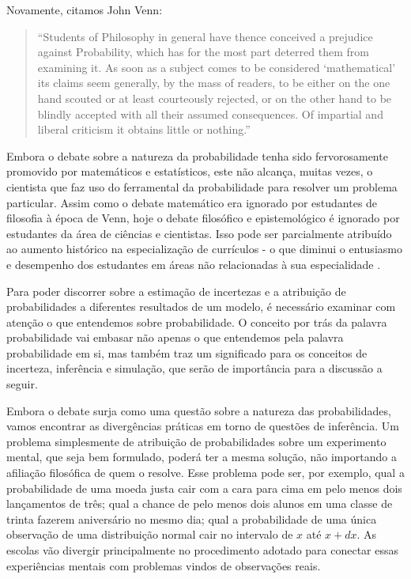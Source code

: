 Novamente, citamos John Venn:

\begin{quote}
``Students of Philosophy in general have thence conceived a prejudice against Probability, which has for the most part
deterred them from examining it. As soon as a subject comes to be considered `mathematical' its claims seem generally,
by the mass of readers, to be either on the one hand scouted or at least courteously rejected, or on the other hand
to be blindly accepted with all their assumed consequences. Of impartial and liberal criticism it obtains little or nothing.''
\citep{Venn1866}
\end{quote}

Embora o debate sobre a natureza da probabilidade tenha sido fervorosamente promovido por matemáticos e estatísticos,
este não alcança, muitas vezes, o cientista que faz uso do ferramental da probabilidade para resolver um problema particular.
Assim como o debate matemático era ignorado por estudantes de filosofia à época de Venn, hoje o debate filosófico e 
epistemológico é ignorado por estudantes da área de ciências e cientistas. Isso pode ser parcialmente atribuído 
ao aumento histórico na especialização de currículos - o que diminui o entusiasmo e desempenho dos estudantes em áreas não
relacionadas à sua especialidade \citep{Popham04}.

Para poder discorrer sobre a estimação de incertezas e a atribuição de probabilidades a diferentes resultados de um modelo,
é necessário examinar com atenção o que entendemos sobre probabilidade. O conceito por trás da palavra probabilidade vai
embasar não apenas o que entendemos pela palavra probabilidade em si, mas também traz um significado para os conceitos de
incerteza, inferência e simulação, que serão de importância para a discussão a seguir. 

Embora o debate surja como uma questão sobre a natureza das probabilidades, vamos encontrar as divergências práticas
em torno de questões de inferência. Um problema simplesmente de atribuição de probabilidades sobre um experimento mental,
que seja bem formulado, poderá ter a mesma solução, não importando a afiliação filosófica de quem o resolve. Esse problema 
pode ser, por exemplo, qual a probabilidade de uma moeda justa cair com a cara para cima em pelo menos dois lançamentos de 
três; qual a chance de pelo menos dois alunos em uma classe de trinta fazerem aniversário no mesmo dia; qual a probabilidade 
de uma única observação de uma distribuição normal cair no intervalo de $x$ até $x+dx$. As escolas vão divergir principalmente
no procedimento adotado para conectar essas experiências mentais com problemas vindos de observações reais. 

